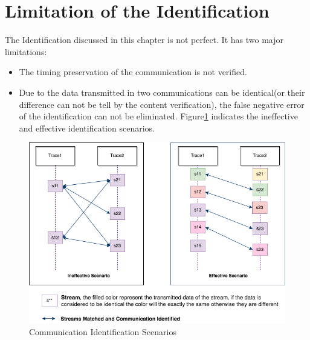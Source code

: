\section{Limitation of the Identification}
The Identification discussed in this chapter is not perfect. It has two major limitations:
\begin{itemize}
    \item The timing preservation of the communication is not verified.
    \item Due to the data transmitted in two communications can be identical(or their difference can not be tell by the content verification), the false negative error of the identification can not be eliminated. Figure\ref{secondlevelmatching} indicates the ineffective and effective identification scenarios. 
\end{itemize}



\begin{figure}[H]
\centerline{\includegraphics[scale=0.7]{Figures/secondlevelmatching}}
 \caption{Communication Identification Scenarios}
\label{secondlevelmatching}
\end{figure}




